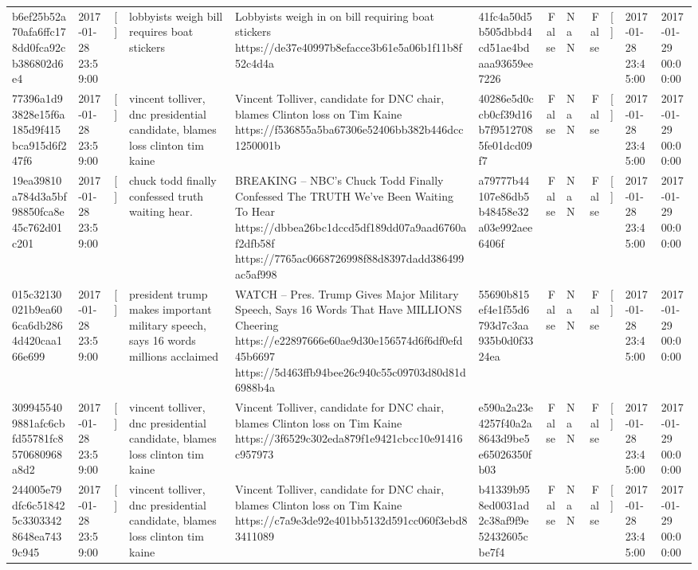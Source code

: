 \begin{tabular}{llllllrlrlll}
b6ef25b52a70afa6ffc178dd0fca92cb386802d6e4 & 2017-01-28 23:59:00 & [] & lobbyists weigh bill requires boat stickers & Lobbyists weigh in on bill requiring boat stickers https://de37e40997b8efacce3b61e5a06b1f11b8f52c4d4a & 41fc4a50d5b505dbbd4cd51ae4bdaaa93659ee7226 & False & NaN & False & [] & 2017-01-28 23:45:00 & 2017-01-29 00:00:00 \\
77396a1d93828e15f6a185d9f415bca915d6f247f6 & 2017-01-28 23:59:00 & [] & vincent tolliver, dnc presidential candidate, blames loss clinton tim kaine & Vincent Tolliver, candidate for DNC chair, blames Clinton loss on Tim Kaine https://f536855a5ba67306e52406bb382b446dcc1250001b & 40286e5d0ccb0cf39d16b7f95127085fe01dcd09f7 & False & NaN & False & [] & 2017-01-28 23:45:00 & 2017-01-29 00:00:00 \\
19ea39810a784d3a5bf98850fca8e45c762d01c201 & 2017-01-28 23:59:00 & [] & chuck todd finally confessed truth waiting hear. & BREAKING – NBC’s Chuck Todd Finally Confessed The TRUTH We’ve Been Waiting To Hear https://dbbea26bc1dccd5df189dd07a9aad6760af2dfb58f https://7765ac0668726998f88d8397dadd386499ac5af998 & a79777b44107e86db5b48458e32a03e992aee6406f & False & NaN & False & [] & 2017-01-28 23:45:00 & 2017-01-29 00:00:00 \\
015c32130021b9ea606ca6db2864d420caa166e699 & 2017-01-28 23:59:00 & [] & president trump makes important military speech, says 16 words millions acclaimed & WATCH – Pres. Trump Gives Major Military Speech, Says 16 Words That Have MILLIONS Cheering https://e22897666e60ae9d30e156574d6f6df0efd45b6697 https://5d463ffb94bee26c940c55c09703d80d81d6988b4a & 55690b815ef4e1f55d6793d7c3aa935b0d0f3324ea & False & NaN & False & [] & 2017-01-28 23:45:00 & 2017-01-29 00:00:00 \\
3099455409881afc6cbfd55781fc8570680968a8d2 & 2017-01-28 23:59:00 & [] & vincent tolliver, dnc presidential candidate, blames loss clinton tim kaine & Vincent Tolliver, candidate for DNC chair, blames Clinton loss on Tim Kaine https://3f6529c302eda879f1e9421cbcc10e91416c957973 & e590a2a23e4257f40a2a8643d9be5e65026350fb03 & False & NaN & False & [] & 2017-01-28 23:45:00 & 2017-01-29 00:00:00 \\
244005e79dfc6c518425c33033428648ea7439c945 & 2017-01-28 23:59:00 & [] & vincent tolliver, dnc presidential candidate, blames loss clinton tim kaine & Vincent Tolliver, candidate for DNC chair, blames Clinton loss on Tim Kaine https://c7a9e3de92e401bb5132d591cc060f3ebd83411089 & b41339b958ed0031ad2c38af9f9e52432605cbe7f4 & False & NaN & False & [] & 2017-01-28 23:45:00 & 2017-01-29 00:00:00 \\

\end{tabular}
